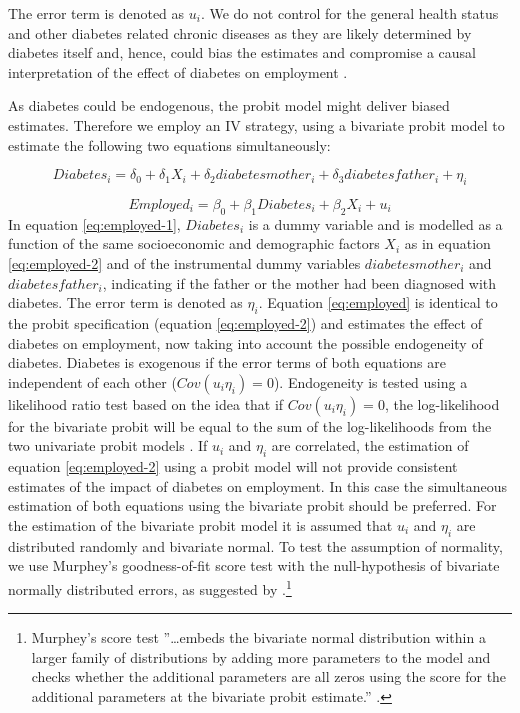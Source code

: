The error term is denoted as $u_{i}$. We do not control
for the general health status and other diabetes related chronic diseases
as they are likely determined by diabetes itself and, hence, could
bias the estimates and compromise a causal interpretation of the effect
of diabetes on employment \parencite{Angrist2009a}.

As diabetes could be endogenous, the probit model might
deliver biased estimates. Therefore we employ an \ac{IV} strategy,
using a bivariate probit model to estimate the following two equations
simultaneously:


\begin{equation}
Diabetes_{i}=\delta_{0}+\delta_{1}X_{i}+\delta_{2}diabetesmother_{i}+\delta_{3}diabetesfather_{i}+\eta_{i}\label{eq:employed-1}
\end{equation}



\begin{equation}
Employed_{i}=\beta_{0}+\beta_{1}Diabetes_{i}+\beta_{2}X_{i}+u_{i}\label{eq:employed}
\end{equation}
In equation \ref{eq:employed-1}, $Diabetes_{i}$
is a dummy variable and is modelled as a function of the same socioeconomic
and demographic factors $X_{i}$ as in equation \ref{eq:employed-2}
and of the instrumental dummy variables $diabetesmother_{i}$ and
$diabetesfather_{i}$, indicating if the father or the mother had
been diagnosed with diabetes. The error term is denoted as $\eta_{i}$.
Equation \ref{eq:employed} is identical to the probit specification
(equation \ref{eq:employed-2}) and estimates the effect of diabetes
on employment, now taking into account the possible endogeneity of
diabetes. Diabetes is exogenous if the error terms of both equations
are independent of each other ($Cov(u_{i}\eta_{i})=0$). Endogeneity
is tested using a likelihood ratio test based on the idea that if
$Cov(u_{i}\eta_{i})=0$, the log-likelihood for the bivariate probit
will be equal to the sum of the log-likelihoods from the two univariate
probit models \parencite{Knapp1998}. If $u_{i}$ 
 and $\eta_{i}$ are correlated, the estimation of equation \ref{eq:employed-2}
using a probit model will not provide consistent estimates of the
impact of diabetes on employment. In this case the simultaneous estimation
of both equations using the bivariate probit should be preferred.
For the estimation of the bivariate probit model it is assumed that
$u_{i}$ 
 and $\eta_{i}$ are distributed randomly and bivariate normal. To
test the assumption of normality, we use Murphey's goodness-of-fit
score test with the null-hypothesis of bivariate normally distributed
errors, as suggested by \textcite{Chiburis2012}.\footnote{Murphey's score test ''\ldots{}embeds the bivariate normal distribution
within a larger family of distributions by adding more parameters
to the model and checks whether the additional parameters are all
zeros using the score for the additional parameters at the bivariate
probit estimate.'' \parencite[p. 19]{Chiburis2012}.}


